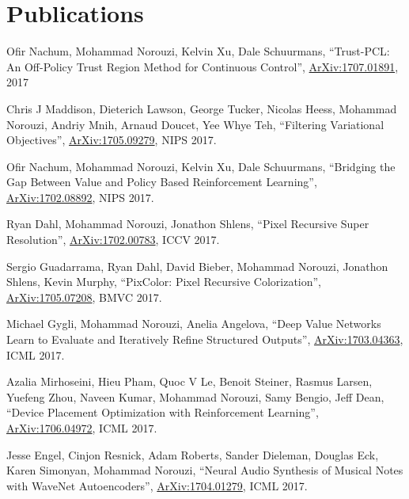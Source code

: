 \documentclass[10pt,letterpaper]{article}
\renewenvironment{itemize}{
  \begin{list}{}{
    \setlength{\leftmargin}{1.5em}
  }
}{
  \end{list}
}
\begin{document}
\section*{Publications}

\begin{itemize}

\item Ofir Nachum, Mohammad Norouzi, Kelvin Xu, Dale Schuurmans,
``Trust-PCL: An Off-Policy Trust Region Method for Continuous Control'',
\href{https://arxiv.org/pdf/1707.01891}{ArXiv:1707.01891}, 2017

\item Chris J Maddison, Dieterich Lawson, George Tucker, Nicolas Heess, Mohammad Norouzi, Andriy Mnih, Arnaud Doucet, Yee Whye Teh,
``Filtering Variational Objectives'',
\href{https://arxiv.org/pdf/1705.09279}{ArXiv:1705.09279}, NIPS 2017.

\item Ofir Nachum, Mohammad Norouzi, Kelvin Xu, Dale Schuurmans,
``Bridging the Gap Between Value and Policy Based Reinforcement Learning'',
\href{https://arxiv.org/pdf/1702.08892}{ArXiv:1702.08892}, NIPS 2017.

\item Ryan Dahl, Mohammad Norouzi, Jonathon Shlens,
``Pixel Recursive Super Resolution'',
\href{https://arxiv.org/pdf/1702.00783}{ArXiv:1702.00783}, ICCV 2017.

\item Sergio Guadarrama, Ryan Dahl, David Bieber, Mohammad Norouzi, Jonathon Shlens, Kevin Murphy,
``PixColor: Pixel Recursive Colorization'',
\href{https://arxiv.org/pdf/1705.07208}{ArXiv:1705.07208}, BMVC 2017.

\item Michael Gygli, Mohammad Norouzi, Anelia Angelova,
``Deep Value Networks Learn to Evaluate and Iteratively Refine Structured Outputs'',
\href{https://arxiv.org/pdf/1703.04363}{ArXiv:1703.04363}, ICML 2017.

\item Azalia Mirhoseini, Hieu Pham, Quoc V Le, Benoit Steiner, Rasmus Larsen, Yuefeng Zhou, Naveen Kumar, Mohammad Norouzi, Samy Bengio, Jeff Dean,
``Device Placement Optimization with Reinforcement Learning'',
\href{https://arxiv.org/pdf/1706.04972.pdf}{ArXiv:1706.04972}, ICML 2017.

\item Jesse Engel, Cinjon Resnick, Adam Roberts, Sander Dieleman, Douglas Eck, Karen Simonyan, Mohammad Norouzi,
``Neural Audio Synthesis of Musical Notes with WaveNet Autoencoders'',
\href{https://arxiv.org/pdf/1704.01279}{ArXiv:1704.01279}, ICML 2017.


\end{itemize}
\end{document}
